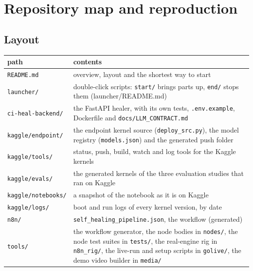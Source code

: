 \documentclass[11pt,a4paper]{report}
\begin{document}
\chapter{Repository map and reproduction}

\section{Layout}

\begin{longtable}{>{\raggedright\arraybackslash}p{0.241\dimexpr\linewidth-4\tabcolsep\relax}>{\raggedright\arraybackslash}p{0.759\dimexpr\linewidth-4\tabcolsep\relax}}
\toprule
\textbf{path} & \textbf{contents} \\
\midrule
\endhead
\texttt{README.\allowbreak{}md} & overview, layout and the shortest way to start \\
\texttt{launcher/\allowbreak{}} & double-click scripts: \texttt{start/\allowbreak{}} brings parts up, \texttt{end/\allowbreak{}} stops them (launcher/README.md) \\
\texttt{ci-\allowbreak{}heal-\allowbreak{}backend/\allowbreak{}} & the FastAPI healer, with its own tests, \texttt{.\allowbreak{}env.\allowbreak{}example}, Dockerfile and \texttt{docs/\allowbreak{}LLM\_\allowbreak{}CONTRACT.\allowbreak{}md} \\
\texttt{kaggle/\allowbreak{}endpoint/\allowbreak{}} & the endpoint kernel source (\texttt{deploy\_\allowbreak{}src.\allowbreak{}py}), the model registry (\texttt{models.\allowbreak{}json}) and the generated push folder \\
\texttt{kaggle/\allowbreak{}tools/\allowbreak{}} & status, push, build, watch and log tools for the Kaggle kernels \\
\texttt{kaggle/\allowbreak{}evals/\allowbreak{}} & the generated kernels of the three evaluation studies that ran on Kaggle \\
\texttt{kaggle/\allowbreak{}notebooks/\allowbreak{}} & a snapshot of the notebook as it is on Kaggle \\
\texttt{kaggle/\allowbreak{}logs/\allowbreak{}} & boot and run logs of every kernel version, by date \\
\texttt{n8n/\allowbreak{}} & \texttt{self\_\allowbreak{}healing\_\allowbreak{}pipeline.\allowbreak{}json}, the workflow (generated) \\
\texttt{tools/\allowbreak{}} & the workflow generator, the node bodies in \texttt{nodes/\allowbreak{}}, the node test suites in \texttt{tests/\allowbreak{}}, the real-engine rig in \texttt{n8n\_\allowbreak{}rig/\allowbreak{}}, the live-run and setup scripts in \texttt{golive/\allowbreak{}}, the demo video builder in \texttt{media/\allowbreak{}} \\

\end{longtable}
\end{document}
